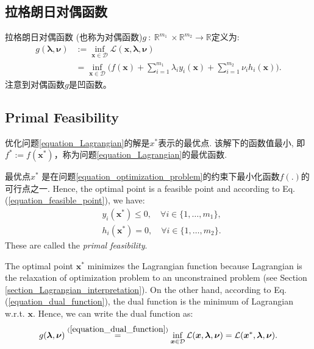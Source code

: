 \documentclass[lang=cn,10pt]{gorgeousnbook}
\numberwithin{equation}{section}%
\numberwithin{figure}{section}%
\begin{document}
\subsection{拉格朗日对偶函数}
\begin{definition}
拉格朗日对偶函数 (也称为对偶函数)$g~:~\mathbb{R}^{m_1}~\times \mathbb{R}^{m_2}\to\mathbb{R}$定义为:
\begin{equation}
\begin{aligned}
  g(\boldsymbol\lambda,\boldsymbol\nu)& :=\inf_{\boldsymbol{x}\in\mathcal{D}}\mathcal{L}(\boldsymbol{x},\boldsymbol{\lambda},\boldsymbol{\nu})  \\
  &=\inf_{\boldsymbol{x}\in\mathcal{D}}\Big(f(\boldsymbol{x})+\sum_{i=1}^{m_1}\lambda_iy_i(\boldsymbol{x})+\sum_{i=1}^{m_2}\nu_i h_i(\boldsymbol{x})\Big).
  \end{aligned}
\end{equation}
注意到对偶函数$g$是凹函数。
\end{definition}
\subsection{Primal Feasibility}
\begin{definition}
优化问题\eqref{equation_Lagrangian}的解是$x^*$表示的最优点. 该解下的函数值最小, 即$f^* := f(\boldsymbol{x}^*)$，称为问题\eqref{equation_Lagrangian}的最优函数.
\end{definition}
最优点$x^*$ 是在问题\eqref{equation_optimization_problem}的约束下最小化函数$ f(.) $的可行点之一.
Hence, the optimal point is a feasible point and according to Eq. (\ref{equation_feasible_point}), we have:
\begin{align}
& y_i(\boldsymbol{x}^*) \leq 0, \quad \forall i \in \{1, \ldots, m_1\}, \\
& h_i(\boldsymbol{x}^*) = 0, \quad \forall i \in \{1, \ldots, m_2\}.
\end{align}
These are called the \textit{primal feasibility}. 

The optimal point $\boldsymbol{x}^*$ minimizes the Lagrangian function because Lagrangian is the relaxation of optimization problem to an unconstrained problem (see Section \ref{section_Lagrangian_interpretation}). On the other hand, according to Eq. (\ref{equation_dual_function}), the dual function is the minimum of Lagrangian w.r.t. $\boldsymbol{x}$. Hence, we can write the dual function as:
\begin{equation}\label{equation_dual_function_2}
\begin{aligned}
g(\boldsymbol{\lambda}, \boldsymbol{\nu}) \overset{(\ref{equation_dual_function})}{=} \inf_{\boldsymbol{x} \in \mathcal{D}} \mathcal{L}(\boldsymbol{x},\boldsymbol{\lambda},\boldsymbol{\nu}) = \mathcal{L}(\boldsymbol{x}^*,\boldsymbol{\lambda},\boldsymbol{\nu}).
\end{aligned}
\end{equation}
\end{document}
